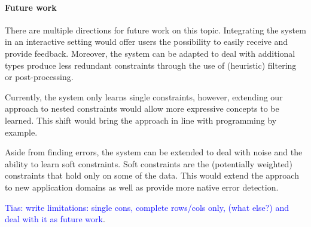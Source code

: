 \documentclass{IEEEtran}
\newcommand{\tias}[1]{\textcolor{blue}{{\sc Tias:} #1}\xspace}
\theoremstyle{definition}
\begin{document}
\paragraph{Future work}
There are multiple directions for future work on this topic.
Integrating the system in an interactive setting would offer users the possibility to easily receive and provide feedback.
Moreover, the system can be adapted to deal with additional types produce less redundant constraints through the use of (heuristic) filtering or post-processing.

Currently, the system only learns single constraints, however, extending our approach to nested constraints would allow more expressive concepts to be learned.
This shift would bring the approach in line with programming by example.

Aside from finding errors, the system can be extended to deal with noise and the ability to learn soft constraints.
Soft constraints are the (potentially weighted) constraints that hold only on some of the data.
This would extend the approach to new application domains as well as provide more native error detection.

\tias{write limitations: single cons, complete rows/cols only, (what else?) and deal with it as future work}.


\end{document}
